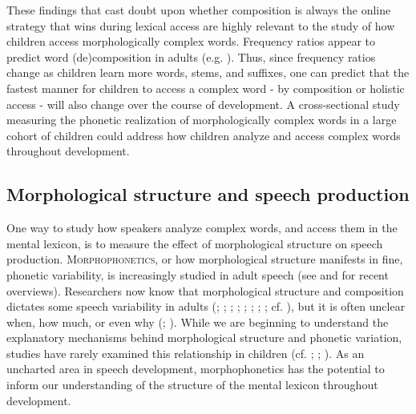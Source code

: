 \documentclass[a4paper,man,floatsintext,natbib,donotrepeattitle, apacite]{apa6}
\begin{document}
These findings that cast doubt upon whether composition is always the online strategy that wins during lexical access are highly relevant to the study of how children access morphologically complex words. Frequency ratios appear to predict word (de)composition in adults (e.g. \citealt{hayCausesConsequencesWord2003}). Thus, since frequency ratios change as children learn more words, stems, and suffixes, one can predict that the fastest manner for children to access a complex word - by composition or holistic access - will also change over the course of development. A cross-sectional study measuring the phonetic realization of morphologically complex words in a large cohort of children could address how children analyze and access complex words throughout development.

\subsection{Morphological structure and speech production}

One way to study how speakers analyze complex words, and access them in the mental lexicon, is to measure the effect of morphological structure on speech production. \textsc{Morphophonetics}, or how morphological structure manifests in fine, phonetic variability, is increasingly studied in adult speech (see \citet{plagPhonologicalPhoneticVariability2014} and \citet{strycharczukPhoneticDetailPhonetic2019} for recent overviews). Researchers now know that morphological structure and composition dictates some speech variability in adults (\citealt{choEffectsMorphemeBoundaries2001}; \citealt{guyExplanationVariablePhonology1991}; \citealt{hayCausesConsequencesWord2003};
\citealt{lee-kimMorphologicalEffectsDarkness2013}; \citealt{plagHomophonyMorphologyAcoustics2017}; \citealt{smithPhoneticDetailThat2012}; \citealt{sugaharaDurationalCorrelatesEnglish2009}; \citealt{tomaschekHowAnticipatoryCoarticulation2019}; cf. \citealt{haniqueRoleMorphologyAcoustic2012}), but it is often unclear when, how much, or even why (\citealt{mousikouMorphologicalEffectsPronunciation2015}; \citealt{plagPhonologicalPhoneticVariability2014}). While we are beginning to understand the explanatory mechanisms behind morphological structure and phonetic variation, studies have rarely examined this relationship in children (cf. \citealt{redfordGrammaticalWordProduction2018}; \citealt{songDurationalCuesFricative2013}; \citealt{songEffectsCoarticulationMorphological2013}). As an uncharted area in speech development, morphophonetics has the potential to inform our understanding of the structure of the mental lexicon throughout development. 
\end{document}
